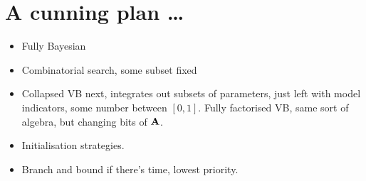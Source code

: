 \documentclass{amsart}
\begin{document}
\section{A cunning plan \ldots}
\begin{itemize}
\item Fully Bayesian
\item Combinatorial search, some subset fixed
\item Collapsed VB next, integrates out subsets of parameters, just left with model indicators, some number 
			between $[0, 1]$. Fully factorised VB, same sort of algebra, but changing bits of ${\bf A}$.
\item Initialisation strategies.
\item Branch and bound if there's time, lowest priority.
\end{itemize}
\end{document}
